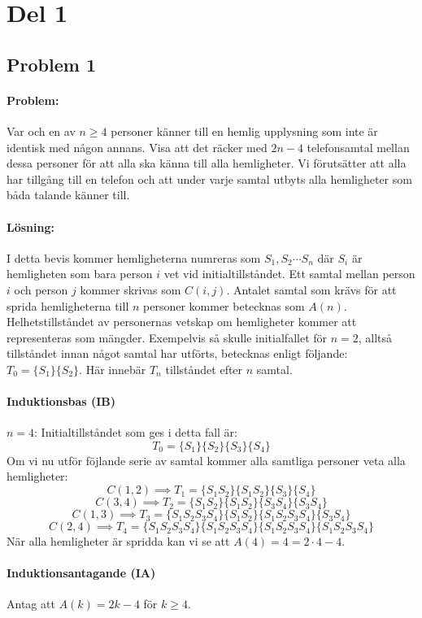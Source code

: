 \documentclass[12pt]{article}
\begin{document}


\section*{Del 1}
\subsection*{Problem 1}
\paragraph{Problem:} Var och en av $n\ge 4$ personer känner till en hemlig upplysning som inte är identisk med någon annans. Visa att det räcker med $2n-4$ telefonsamtal mellan dessa personer för att alla ska känna till alla hemligheter. Vi förutsätter att alla har tillgång till en telefon och att under varje samtal utbyts alla hemligheter som båda talande känner till.
\paragraph{Lösning:} I detta bevis kommer hemligheterna numreras som $S_1,S_2\cdots S_n$ där $S_i$ är hemligheten som bara person $i$ vet vid initialtillståndet. Ett samtal mellan person $i$ och person $j$ kommer skrivas som $C(i,j)$. Antalet samtal som krävs för att sprida hemligheterna till $n$ personer kommer betecknas som $A(n)$. Helhetstillståndet av personernas vetskap om hemligheter kommer att representeras som mängder. Exempelvis så skulle initialfallet för $n=2$, alltså tillståndet innan något samtal har utförts, betecknas enligt följande: $T_0=\{S_1\}\{S_2\}$. Här innebär $T_n$ tillståndet efter $n$ samtal.
\paragraph{Induktionsbas (IB)} $n=4$:
Initialtillståndet som ges i detta fall är:
\[T_0=\{S_1\}\{S_2\}\{S_3\}\{S_4\}\]
Om vi nu utför föjlande serie av samtal kommer alla samtliga personer veta alla hemligheter:
\[C(1,2) \implies T_1=\{S_1S_2\}\{S_1S_2\}\{S_3\}\{S_4\}\]
\[C(3,4) \implies T_2=\{S_1S_2\}\{S_1S_2\}\{S_3S_4\}\{S_3S_4\}\]
\[C(1,3) \implies T_3=\{S_1S_2S_3S_4\}\{S_1S_2\}\{S_1S_2S_3S_4\}\{S_3S_4\}\]
\[C(2,4) \implies T_4=\{S_1S_2S_3S_4\}\{S_1S_2S_3S_4\}\{S_1S_2S_3S_4\}\{S_1S_2S_3S_4\}\]
När alla hemligheter är spridda kan vi se att $A(4)=4=2\cdot 4-4$.
\newpage\noindent\paragraph{Induktionsantagande (IA)} Antag att $A(k)=2k-4$ för $k\ge4$.
\end{document}
